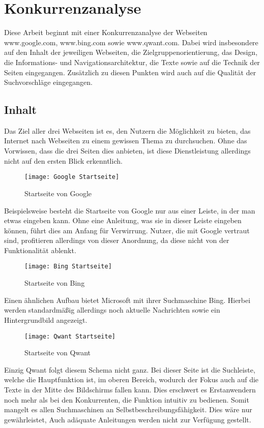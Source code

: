 \section{Konkurrenzanalyse}\label{sec:konkurrenzanalyse}
Diese Arbeit beginnt mit einer Konkurrenzanalyse der Webseiten www.google.com, www.bing.com sowie www.qwant.com.
Dabei wird insbesondere auf den Inhalt der jeweiligen Webseiten, die Zielgruppenorientierung, das Design, die Informations-
und Navigationsarchitektur, die Texte sowie auf die Technik der Seiten eingegangen.
Zusätzlich zu diesen Punkten wird auch auf die Qualität der Suchvorschläge eingegangen.

\subsection{Inhalt}\label{subsec:inhalt}
Das Ziel aller drei Webseiten ist es, den Nutzern die Möglichkeit zu bieten, das Internet nach Webseiten zu einem gewissen
Thema zu durchsuchen.
Ohne das Vorwissen, dass die drei Seiten dies anbieten, ist diese Dienstleistung allerdings nicht auf den ersten
Blick erkenntlich.
\begin{figure}[ht]
    \centering
    \texttt{[image: Google Startseite]}
    \caption{Startseite von Google}\label{fig:figure}
\end{figure}

Beispielsweise besteht die Startseite von Google nur aus einer Leiste, in der man etwas eingeben kann.
Ohne eine Anleitung, was sie in dieser Leiste eingeben können, führt dies am Anfang für Verwirrung.
Nutzer, die mit Google vertraut sind, profitieren allerdings von dieser Anordnung, da diese nicht von der Funktionalität ablenkt.
\begin{figure}[ht]
    \centering
    \texttt{[image: Bing Startseite]}
    \caption{Startseite von Bing}\label{fig:figure2}
\end{figure}
Einen ähnlichen
Aufbau bietet Microsoft mit ihrer Suchmaschine Bing.
Hierbei werden standardmäßig allerdings noch aktuelle Nachrichten sowie ein Hintergrundbild angezeigt.
\begin{figure}[ht]
    \centering
    \texttt{[image: Qwant Startseite]}
    \caption{Startseite von Qwant}\label{fig:figure3}
\end{figure}
Einzig Qwant folgt diesem Schema nicht ganz.
Bei dieser Seite ist die Suchleiste, welche die
Hauptfunktion ist, im oberen Bereich, wodurch der Fokus auch auf die Texte in der Mitte des Bildschirms fallen kann.
Dies erschwert es Erstanwendern noch mehr als bei den Konkurrenten, die Funktion intuitiv zu bedienen.
Somit mangelt es allen Suchmaschinen an Selbstbeschreibungsfähigkeit.
Dies wäre nur gewährleistet, \autocite[Seite 6]{Maulhardt2}
Auch adäquate Anleitungen werden nicht zur Verfügung gestellt.

